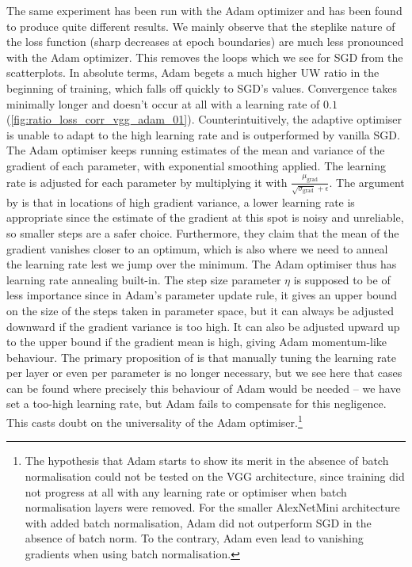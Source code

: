 The same experiment has been run with the Adam optimizer \citep{kingma2014adam}
and has been found to produce quite different results. We mainly observe that
the steplike nature of the loss function (sharp decreases at epoch boundaries)
are much less pronounced with the Adam optimizer. This removes the loops  which we see for
SGD from the scatterplots. In absolute terms, Adam begets a much higher UW ratio
in the beginning of training, which falls off quickly to SGD's values.
Convergence takes minimally longer and doesn't occur at all with a learning rate
of $0.1$ (\cref{fig:ratio_loss_corr_vgg_adam_01}). Counterintuitively, the
adaptive optimiser is unable to adapt to the high learning rate and is
outperformed by vanilla SGD. The Adam optimiser keeps running estimates of the
mean and variance of the gradient of each parameter, with exponential smoothing
applied. The learning rate is adjusted for each parameter by multiplying it with
$\frac{\mu_{\text{grad}}}{\sqrt{\sigma_{\text{grad}}} + \epsilon}$. The argument
by \citet{kingma2014adam} is that in locations of high gradient variance, a
lower learning rate is appropriate since the estimate of the gradient at this
spot is noisy and unreliable, so smaller steps are a safer choice. Furthermore,
they claim that the mean of the gradient vanishes closer to an optimum, which is
also where we need to anneal the learning rate lest we jump over the minimum.
The Adam optimiser thus has learning rate annealing built-in. The step size
parameter $\eta$ is supposed to be of less importance since in Adam's parameter
update rule, it gives an upper bound on the size of the steps taken in parameter
space, but it can always be adjusted downward if the gradient variance is too
high. It can also be adjusted upward up to the upper bound if the gradient mean
is high, giving Adam momentum-like behaviour. The primary proposition of
\citet{kingma2014adam} is that manually tuning the learning rate per layer or
even per parameter is no longer necessary, but we see here that cases can be
found where precisely this behaviour of Adam would be needed -- we have set a
too-high learning rate, but Adam fails to compensate for this negligence. This
casts doubt on the universality of the Adam optimiser.\footnote{The hypothesis
that Adam starts to show its merit in the absence of batch normalisation could
not be tested on the VGG architecture, since training did not progress at all
with any learning rate or optimiser when batch normalisation layers were
removed. For the smaller AlexNetMini architecture with added batch
normalisation, Adam did not outperform SGD in the absence of batch norm. To the
contrary, Adam even lead to vanishing gradients when using batch normalisation.}

